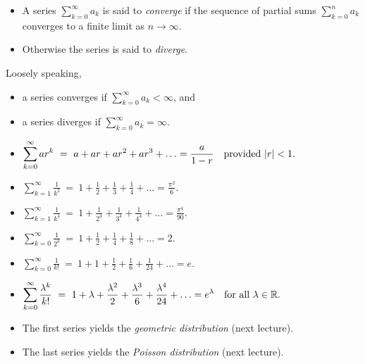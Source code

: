\documentclass[lecture]{csm}
\newcommand{\R}{\mathbb{R}}
\def\it{\item}
\def\bit{\begin{itemize}}
\def\eit{\end{itemize}}
\begin{document}
\begin{definition}
\bit
\it A series $\sum_{k=0}^{\infty} a_k$ is said to \emph{converge} if the sequence of partial sums $\sum_{k=0}^{n}a_k$ converges to a finite limit as $n\to\infty$. 
\it Otherwise the series is said to \emph{diverge}.
\eit
\end{definition}

\begin{remark}
Loosely speaking, 
\bit
\it a series converges if $\sum_{k=0}^{\infty} a_k < \infty$, and %
\it a series diverges  if $\sum_{k=0}^{\infty} a_k = \infty$.
\eit
\end{remark}
\newpage

\begin{example}
\mbox{}\par\vspace{-4ex}
\small
\bit
\it$\displaystyle\sum_{k=0}^{\infty} ar^k 					\ =\ a + ar + ar^2 + ar^3 + \ldots = \frac{a}{1-r} \text{\quad provided $|r|<1$}.$
\it$\displaystyle\sum_{k=1}^{\infty} \frac{1}{k^2}			\ =\ 1 + \frac{1}{2} + \frac{1}{3} + \frac{1}{4} + \ldots = \frac{\pi^2}{6}.$
\it$\displaystyle\sum_{k=1}^{\infty} \frac{1}{k^4}			\ =\ 1 + \frac{1}{2^4} + \frac{1}{3^4} + \frac{1}{4^4} + \ldots = \frac{\pi^4}{90}.$
\it$\displaystyle\sum_{k=0}^{\infty} \frac{1}{2^k}			\ =\ 1 + \frac{1}{2} + \frac{1}{4} + \frac{1}{8} + \ldots = 2.$
\it$\displaystyle\sum_{k=0}^{\infty} \frac{1}{k!}			\ =\ 1 + 1 + \frac{1}{2} + \frac{1}{6} + \frac{1}{24} + \ldots = e.$
\it$\displaystyle\sum_{k=0}^{\infty} \frac{\lambda^k}{k!} 	\ =\ 1 + \lambda + \frac{\lambda^2}{2} + \frac{\lambda^3}{6} + \frac{\lambda^4}{24} + \ldots = e^{\lambda} \text{\quad for all $\lambda\in\R$}.$
\eit
\normalsize
\end{example}
\vspace*{-2ex}
\begin{remark}
\bit
\it The first series yields the \emph{geometric distribution} (next lecture).
\it The last series yields the \emph{Poisson distribution} (next lecture).
\eit
\end{remark}
%
%
\end{document}
